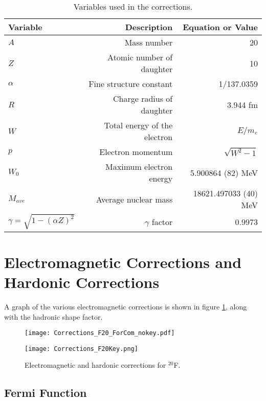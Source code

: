 \documentclass[../MaxHughesThesis.tex]{subfiles}
\begin{document}
\begin{table}[!hbt]
	\centering
	\caption{Variables used in the corrections.}
		\begin{tabular}{lrr}
		Variable & Description & Equation or Value \\ \hline		
		$A$ & Mass number & 20 \\ 
		$Z$ & Atomic number of daughter & 10 \\
		$\alpha$ & Fine structure constant & 1/137.0359\\
		$R$ & Charge radius of daughter & 3.944 fm \cite{Ang13} \\
		$W$ & Total energy of the electron & $E/m_{e}$ \\
		$p$ & Electron momentum & $\sqrt{W^{2} - 1}$ \\
		$W_{0}$ & Maximum electron energy &  5.900864 (82) MeV \\ 
		$M_{ave}$ & Average nuclear mass &  18621.497033 (40) MeV  \\
		$\gamma = \sqrt{1 - (\alpha Z)^{2}} $ & $\gamma$ factor & 0.9973 
		\end{tabular}
	\label{tab:vars}
\end{table}



\section{Electromagnetic Corrections and Hardonic Corrections}
A graph of the various electromagnetic corrections is shown in figure \ref{fig:corrections}, along with the hadronic shape factor. 

\begin{figure}
    \centering
    \begin{minipage}{0.65\textwidth}
        \centerline{\texttt{[image: Corrections\_F20\_ForCom\_nokey.pdf]}} %
    \end{minipage}\hfill
    \begin{minipage}{0.35\textwidth}
        \centerline{\texttt{[image: Corrections\_F20Key.png]}}
    \end{minipage}
    \caption{Electromagnetic and hardonic corrections for $^{20}$F.}
    \label{fig:corrections}
\end{figure}

\subsection{Fermi Function}
\end{document}
